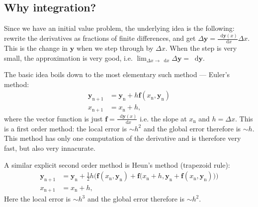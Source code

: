 \documentclass[]{article}
\newcommand{\dd}{\mathop{}\!\mathrm{d}}
\renewcommand{\vec}[1]{\boldsymbol{#1}}
\begin{document}
\subsection{Why integration?}\label{subsec:why-integ}
	Since we have an initial value problem, the underlying idea is the following: rewrite the derivatives as fractions of finite differences, and get $\Delta \vec{y} = \frac{\dd \vec{y}(x)}{\dd x} \Delta x$. This is the change in $\vec{y}$ when we step through by $\Delta x$. When the step is very small, the approximation is very good, i.e. $\lim_{\Delta x \rightarrow \dd x} \Delta \vec{y} = \dd \vec{y}$.

	The basic idea boils down to the most elementary such method --- Euler's method:
	\begin{align}
		\vec{y}_\mathrm{n+1} &= \vec{y}_\mathrm{n} + h \vec{f}(x_\mathrm{n}, \vec{y}_\mathrm{n})\\
		x_\mathrm{n+1} &= x_\mathrm{n} + h, \nonumber
	\end{align}
	where the vector function is just $\vec{f} = \frac{\dd \vec{y}(x)}{\dd x}$ i.e. the slope at $x_\mathrm{n}$ and $h = \Delta x$. This is a first order method: the local error is $\sim h^2$ and the global error therefore is $\sim h$. This method has only one computation of the derivative and is therefore very fast, but also very innacurate.

	A similar explicit second order method is Heun's method (trapezoid rule):
	\begin{align}
		\vec{y}_\mathrm{n+1} &= \vec{y}_\mathrm{n} + \frac{1}{2} h \Big(\vec{f}(x_\mathrm{n}, \vec{y}_\mathrm{n}) + \vec{f}\big(x_\mathrm{n} + h, \vec{y}_\mathrm{n} + \vec{f}(x_\mathrm{n}, \vec{y}_\mathrm{n})\big)\Big)\\
		x_\mathrm{n+1} &= x_\mathrm{n} + h, \nonumber
	\end{align}
	Here the local error is $\sim h^3$ and the global error therefore is $\sim h^2$.
\end{document}
